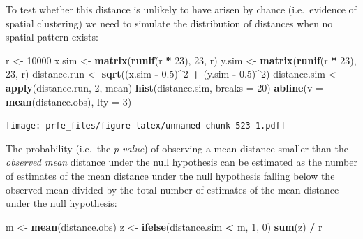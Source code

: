 \documentclass[12pt,a4paper]{book}
\newenvironment{Shaded}{\begin{snugshade}}{\end{snugshade}}
\newcommand{\DataTypeTok}[1]{\textcolor[rgb]{0.13,0.29,0.53}{#1}}
\newcommand{\DecValTok}[1]{\textcolor[rgb]{0.00,0.00,0.81}{#1}}
\newcommand{\FloatTok}[1]{\textcolor[rgb]{0.00,0.00,0.81}{#1}}
\newcommand{\KeywordTok}[1]{\textcolor[rgb]{0.13,0.29,0.53}{\textbf{#1}}}
\newcommand{\NormalTok}[1]{#1}
\newcommand{\OperatorTok}[1]{\textcolor[rgb]{0.81,0.36,0.00}{\textbf{#1}}}
\newcommand{\StringTok}[1]{\textcolor[rgb]{0.31,0.60,0.02}{#1}}
\theoremstyle{definition}
\theoremstyle{definition}
\theoremstyle{definition}
\theoremstyle{remark}
\begin{document}
To test whether this distance is unlikely to have arisen by chance
(i.e.~evidence of spatial clustering) we need to simulate the
distribution of distances when no spatial pattern exists:

\begin{Shaded}
\begin{Highlighting}[]
\NormalTok{r <-}\StringTok{ }\DecValTok{10000}
\NormalTok{x.sim <-}\StringTok{ }\KeywordTok{matrix}\NormalTok{(}\KeywordTok{runif}\NormalTok{(r }\OperatorTok{*}\StringTok{ }\DecValTok{23}\NormalTok{), }\DecValTok{23}\NormalTok{, r)}
\NormalTok{y.sim <-}\StringTok{ }\KeywordTok{matrix}\NormalTok{(}\KeywordTok{runif}\NormalTok{(r }\OperatorTok{*}\StringTok{ }\DecValTok{23}\NormalTok{), }\DecValTok{23}\NormalTok{, r)}
\NormalTok{distance.run <-}\StringTok{ }\KeywordTok{sqrt}\NormalTok{((x.sim }\OperatorTok{-}\StringTok{ }\FloatTok{0.5}\NormalTok{)}\OperatorTok{^}\DecValTok{2} \OperatorTok{+}\StringTok{ }\NormalTok{(y.sim }\OperatorTok{-}\StringTok{ }\FloatTok{0.5}\NormalTok{)}\OperatorTok{^}\DecValTok{2}\NormalTok{)}
\NormalTok{distance.sim <-}\StringTok{ }\KeywordTok{apply}\NormalTok{(distance.run, }\DecValTok{2}\NormalTok{, mean)}
\KeywordTok{hist}\NormalTok{(distance.sim, }\DataTypeTok{breaks =} \DecValTok{20}\NormalTok{)}
\KeywordTok{abline}\NormalTok{(}\DataTypeTok{v =} \KeywordTok{mean}\NormalTok{(distance.obs), }\DataTypeTok{lty =} \DecValTok{3}\NormalTok{)}
\end{Highlighting}
\end{Shaded}

\texttt{[image: prfe\_files/figure-latex/unnamed-chunk-523-1.pdf]}

The probability (i.e.~the \emph{p-value}) of observing a mean distance
smaller than the \emph{observed mean} distance under the null hypothesis
can be estimated as the number of estimates of the mean distance under
the null hypothesis falling below the observed mean divided by the total
number of estimates of the mean distance under the null hypothesis:

\begin{Shaded}
\begin{Highlighting}[]
\NormalTok{m <-}\StringTok{ }\KeywordTok{mean}\NormalTok{(distance.obs)}
\NormalTok{z <-}\StringTok{ }\KeywordTok{ifelse}\NormalTok{(distance.sim }\OperatorTok{<}\StringTok{ }\NormalTok{m, }\DecValTok{1}\NormalTok{, }\DecValTok{0}\NormalTok{)}
\KeywordTok{sum}\NormalTok{(z) }\OperatorTok{/}\StringTok{ }\NormalTok{r}
\end{Highlighting}
\end{Shaded}
\end{document}

